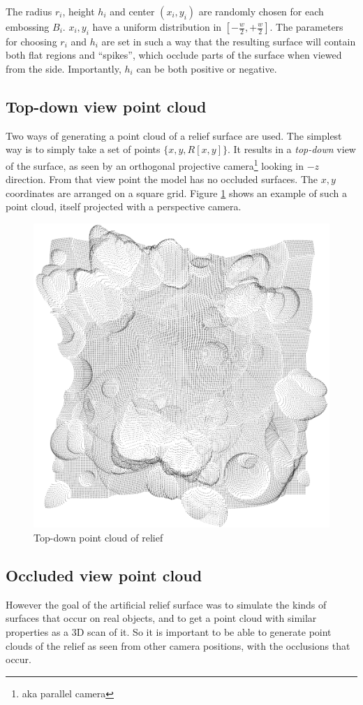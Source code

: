 The radius $r_i$, height $h_i$ and center $(x_i, y_i)$ are randomly chosen for each embossing $B_i$. $x_i, y_i$ have a uniform distribution in $[-\frac{w}{2}, +\frac{w}{2}]$. The parameters for choosing $r_i$ and $h_i$ are set in such a way that the resulting surface will contain both flat regions and ``spikes'', which occlude parts of the surface when viewed from the side. Importantly, $h_i$ can be both positive or negative.

\subsection{Top-down view point cloud}
Two ways of generating a point cloud of a relief surface are used. The simplest way is to simply take a set of points $\{ x, y, R[x,y] \}$. It results in a \emph{top-down} view of the surface, as seen by an orthogonal projective camera\footnote{aka parallel camera} looking in $-z$ direction. From that view point the model has no occluded surfaces. The $x, y$ coordinates are arranged on a square grid. Figure \ref{fig:relief_plain} shows an example of such a point cloud, itself projected with a perspective camera.

\begin{figure}[h]
\centering
\includegraphics[width=.5\textwidth]{fig/r1_plain.png}
\caption{Top-down point cloud of relief}
\label{fig:relief_plain}
\end{figure}

\subsection{Occluded view point cloud}
However the goal of the artificial relief surface was to simulate the kinds of surfaces that occur on real objects, and to get a point cloud with similar properties as a 3D scan of it. So it is important to be able to generate point clouds of the relief as seen from other camera positions, with the occlusions that occur.

